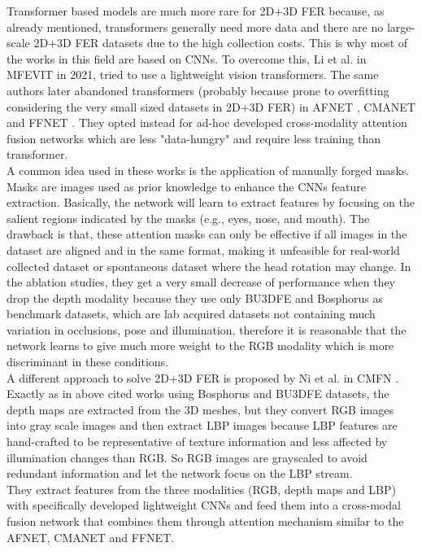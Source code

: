Transformer based models are much more rare for 2D+3D FER because, as already mentioned, transformers generally need more data and there are no large-scale 2D+3D FER datasets due to the high collection costs. This is why most of the works in this field are based on CNNs. To overcome this, Li et al. in MFEVIT\cite{RW_8D_MFEVIT} in 2021, tried to use a lightweight vision transformers.
The same authors later abandoned transformers (probably because prone to overfitting considering the very small sized datasets in 2D+3D FER) in AFNET \cite{RW_8A_AFNET}, CMANET \cite{RW_8B_CMANET} and FFNET \cite{RW_8C_FFNET}. They opted instead for ad-hoc developed cross-modality attention fusion networks which are less "data-hungry" and require less training than transformer.\\
A common idea used in these works is the application of manually forged masks. Masks are images used as prior knowledge to enhance the CNNs feature extraction. Basically, the network will learn to extract features by focusing on the salient regions indicated by the masks\cite{RW_8A_AFNET} (e.g., eyes, nose, and mouth). The drawback is that, these attention masks can only be effective if all images in the dataset are aligned and in the same format, making it unfeasible for real-world collected dataset or spontaneous dataset where the head rotation may change. In the ablation studies, they get a very small decrease of performance when they drop the depth modality because they use only BU3DFE \cite{BU3DFE} and Bosphorus \cite{Bosphorus} as benchmark datasets, which are lab acquired datasets not containing much variation in occlusions, pose and illumination, therefore it is reasonable that the network learns to give much more weight to the RGB modality which is more discriminant in these conditions.\\

A different approach to solve 2D+3D FER is proposed by Ni et al. in CMFN \cite{RW_9_CMFN}. Exactly as in above cited works using Bosphorus and BU3DFE datasets, the depth maps are extracted from the 3D meshes, but they convert RGB images into gray scale images and then extract LBP images because LBP features are hand-crafted to be representative of texture information and less affected by illumination changes than RGB. So RGB images are grayscaled to avoid redundant information and let the network focus on the LBP stream.\\
They extract features from the three modalities (RGB, depth maps and LBP) with specifically developed lightweight CNNs and feed them into a cross-modal fusion network that combines them through attention mechanism similar to the AFNET, CMANET and FFNET. 

